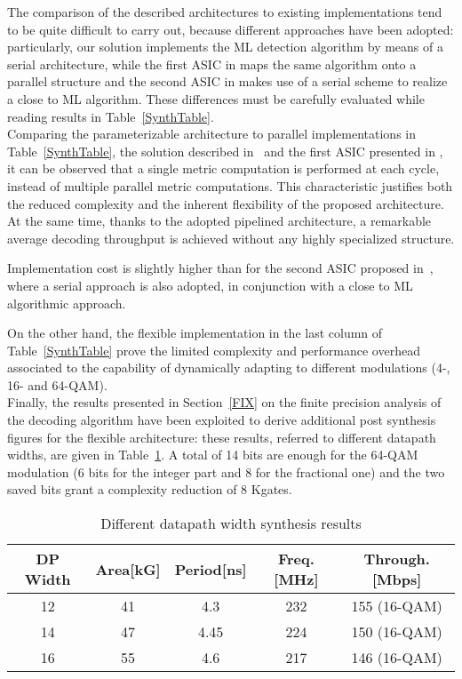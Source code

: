 \documentclass[12pt,onecolumn,draftclsnofoot]{IEEEtran}
\begin{document}
The comparison of the described architectures to existing implementations tend 
to be quite difficult to carry out, because different approaches have been
adopted: particularly, our solution implements the ML detection algorithm by means of 
a serial architecture, while the first ASIC in \cite{ethvlsi} maps the same algorithm
onto a parallel structure and the second ASIC in \cite{ethvlsi} makes use of a
serial scheme to realize a close to ML algorithm. These differences must
be carefully evaluated while reading results in Table~\ref{SynthTable}.\\

Comparing the parameterizable architecture to parallel implementations
in Table~\ref{SynthTable}, the solution described in~\cite{lundvlsi} and 
the first ASIC presented in \cite{ethvlsi},
it can be observed that a single metric computation is performed at
each cycle, instead of multiple parallel metric computations. This
characteristic justifies both the reduced complexity and the inherent
flexibility of the proposed architecture.
At the same time, thanks to the adopted pipelined architecture, a
remarkable average decoding throughput is achieved without any 
highly specialized structure.

Implementation cost is slightly higher than for the second ASIC 
proposed in~\cite{ethvlsi}, where a serial approach is also adopted, in conjunction with 
a close to ML algorithmic approach. 

On the other hand, the flexible implementation in the last column of Table~\ref{SynthTable} 
prove the limited complexity and performance overhead associated to the 
capability of dynamically adapting to different modulations (4-,
16- and 64-QAM).\\

Finally, the results presented in Section~\ref{FIX} on the finite precision
analysis of the decoding algorithm have been exploited to derive
additional post synthesis figures for the flexible architecture:
these results, referred to different datapath widths, are given in
Table~\ref{Table:DP Width Synth}. A total of 14 bits are enough for
the 64-QAM modulation (6 bits for the integer part and 8 for the
fractional one) and the two saved bits grant a complexity reduction
of 8 Kgates.


\begin{table}
\centering
\caption{Different datapath width synthesis results}
\begin{tabular}{|c||c|c|c|c|} \hline
DP Width&Area[kG]&Period[ns]&Freq.[MHz]&Through.[Mbps]\\ \hline\hline
12 & 41 & 4.3 & 232 & 155 (16-QAM)\\ \hline
14 & 47 & 4.45 & 224 & 150 (16-QAM)\\ \hline
16 & 55 & 4.6 & 217 & 146 (16-QAM)\\ \hline\end{tabular}
\label{Table:DP Width Synth}
\end{table}
\end{document}

